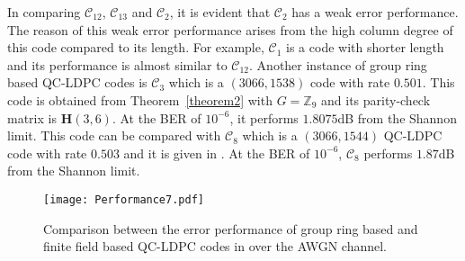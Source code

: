 \documentclass[journal,draftclsnofoot,onecolumn,12pt,twoside]{IEEEtran}
\begin{document}
{In comparing $\mathcal{C}_{12}$, $\mathcal{C}_{13}$ and $\mathcal{C}_2$, it is evident that  $\mathcal{C}_2$ has a weak error performance. The reason of this weak error performance arises from the high column degree of this code compared to its length. For example,  $\mathcal{C}_1$ is a code with shorter length and its performance is almost similar to $\mathcal{C}_{12}$. Another instance of group ring based QC-LDPC codes is $\mathcal{C}_3$ which is a $(3066,1538)$ code with rate $0.501$. This code is obtained from Theorem~\ref{theorem2} with $G=\mathbb{Z}_9$ and its parity-check matrix is $\mathbf{H}(3,6)$. At the BER of $10^{-6}$, it performs $1.8075$dB from the Shannon limit. This code can be compared with $\mathcal{C}_8$ which is a  $(3066,1544)$ QC-LDPC code with rate $0.503$ and it is given in \cite[Example 1]{6}. At the BER of $10^{-6}$, $\mathcal{C}_8$ performs $1.87$dB from the Shannon limit.}

\begin{figure}[!h]
\centering
\texttt{[image: Performance7.pdf]}
\caption{Comparison between the error performance of group ring based and finite field based QC-LDPC codes in \cite{6,C12} over the AWGN channel.}
\label{figsim7}
\end{figure}
\end{document}
